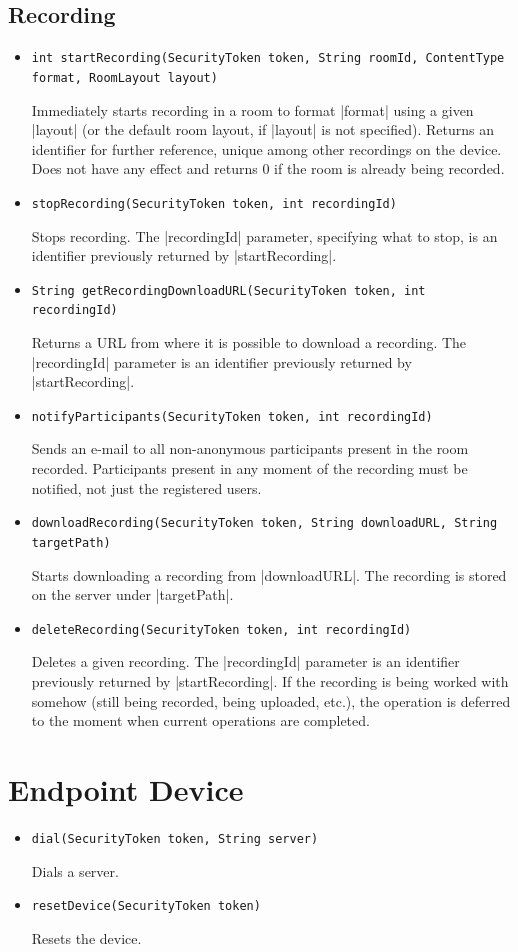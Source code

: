 \documentclass[a4paper]{report}
\newenvironment{Api}{\begin{itemize}}{\end{itemize}}
\newcommand{\ApiCode}[1]{\lstinline[style=styleApi]|#1|}
\newcommand{\ApiItem}[1]{\item #1 %

}
\newcommand{\ApiCmd}[1]{\ApiItem{\ApiCode{#1}}}
\begin{document}
\subsection{Recording}
\begin{Api}

\ApiCmd{int startRecording(SecurityToken token, String roomId, ContentType format, RoomLayout layout)}
Immediately starts recording in a room to format |format| using a given |layout| (or the default room layout, if |layout| is not specified). Returns an identifier for further reference, unique among other recordings on the device. Does not have any effect and returns 0 if the room is already being recorded.

\ApiCmd{stopRecording(SecurityToken token, int recordingId)}
Stops recording. The |recordingId| parameter, specifying what to stop, is an identifier previously returned by |startRecording|.

\ApiCmd{String getRecordingDownloadURL(SecurityToken token, int recordingId)}
Returns a URL from where it is possible to download a recording. The |recordingId| parameter is an identifier previously returned by |startRecording|.

\ApiCmd{notifyParticipants(SecurityToken token, int recordingId)}
Sends an e-mail to all non-anonymous participants present in the room recorded. Participants present in any moment of the recording must be notified, not just the registered users.

\ApiCmd{downloadRecording(SecurityToken token, String downloadURL, String targetPath)}
Starts downloading a recording from |downloadURL|. The recording is stored on the server under |targetPath|.

\ApiCmd{deleteRecording(SecurityToken token, int recordingId)}
Deletes a given recording. The |recordingId| parameter is an identifier previously returned by |startRecording|. If the recording is being worked with somehow (still being recorded, being uploaded, etc.), the operation is deferred to the moment when current operations are completed.

\end{Api}


\section{Endpoint Device} \label{sect:connector-endpoint-api}

\begin{Api}

\ApiCmd{dial(SecurityToken token, String server)}
Dials a server.

\ApiCmd{resetDevice(SecurityToken token)}
Resets the device.

\end{Api}
\end{document}

